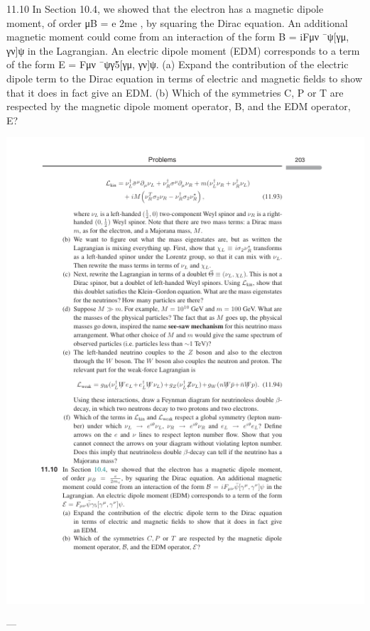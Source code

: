 11.10 In Section 10.4, we showed that the electron has a magnetic dipole moment,
of order μB =
e
2me , by squaring the Dirac equation. An additional magnetic
moment could come from an interaction of the form B = iFμν ¯ψ[γμ, γν]ψ in the
Lagrangian. An electric dipole moment (EDM) corresponds to a term of the form
E = Fμν ¯ψγ5[γμ, γν]ψ.
(a) Expand the contribution of the electric dipole term to the Dirac equation
in terms of electric and magnetic ﬁelds to show that it does in fact give
an EDM.
(b) Which of the symmetries C, P or T are respected by the magnetic dipole
moment operator, B, and the EDM operator, E?

\includegraphics{./figs/11_Spinor_solutions_and_CPT_page_223.png}

---

